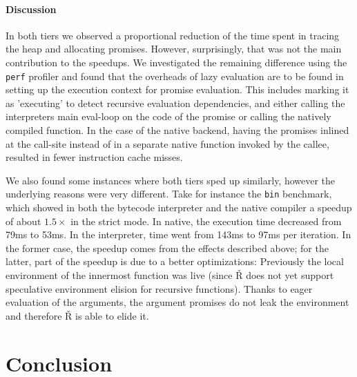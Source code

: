 \documentclass[review,nonacm,screen,acmsmall,anonymous=true]{acmart}
\newcommand{\authorcomment}[3]{}
\newcommand{\SK}[1]{\authorcomment{yellow}{SK}{#1}}
\renewcommand{\Rsh}{{\sf\v R}\xspace}
\begin{document}
\paragraph{Discussion}

In both tiers we observed a proportional reduction of the time spent in tracing
the heap and allocating promises.
However, surprisingly, that was not the main contribution to the speedups.
We investigated the remaining difference using the \lstinline{perf} profiler
and found that the overheads of lazy evaluation are to be found in setting up the
execution context for promise evaluation. This includes marking it as 'executing'
to detect recursive evaluation dependencies, and either calling the interpreters
main eval-loop on the code of the promise or calling the natively compiled
function. In the case of the native backend, having the promises inlined at the
call-site instead of in a separate native function invoked by the callee,
resulted in fewer instruction cache misses.

We also found some instances where both tiers sped up similarly,
however the underlying reasons were very different.
Take for instance the \lstinline{bin} benchmark, which showed in both
the bytecode interpreter and the native compiler a speedup of about $1.5\times$
in the strict mode. In native, the execution time decreased from 79ms to 53ms. In
the interpreter, time went from 143ms to 97ms per iteration. In the former case, the speedup
comes from the effects described above; \SK{please review from here to the end of the paragraph} for the latter, part of the speedup is due to a better optimizations: Previously the local
environment of the innermost function was live (since \Rsh does not yet
support speculative environment elision for recursive functions). Thanks to eager
evaluation of the arguments, the argument promises do not leak the environment
and therefore \Rsh is able to elide it.

\section{Conclusion}\label{sec:conclusion}
\end{document}
